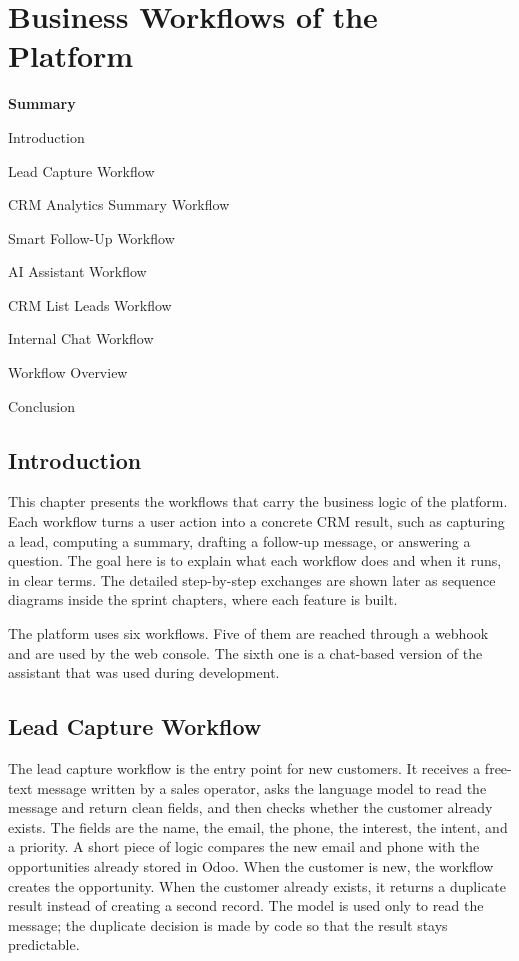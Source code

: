 \documentclass[12pt,a4paper,oneside]{report}
\newcommand{\chsummaryitem}[3]{\noindent\makebox[1.15cm][l]{#1}#2\,\dotfill\,\pageref{#3}\par}
\begin{document}
\chapter{Business Workflows of the Platform}

\vspace{0.35cm}
{\Large\bfseries Summary}\par
{}\vspace{0.30cm}
{\small
\chsummaryitem{3.1}{Introduction}{sumlbl:c3s1}
\chsummaryitem{3.2}{Lead Capture Workflow}{sumlbl:c3s2}
\chsummaryitem{3.3}{CRM Analytics Summary Workflow}{sumlbl:c3s3}
\chsummaryitem{3.4}{Smart Follow-Up Workflow}{sumlbl:c3s4}
\chsummaryitem{3.5}{AI Assistant Workflow}{sumlbl:c3s5}
\chsummaryitem{3.6}{CRM List Leads Workflow}{sumlbl:c3s6}
\chsummaryitem{3.7}{Internal Chat Workflow}{sumlbl:c3s7}
\chsummaryitem{3.8}{Workflow Overview}{sumlbl:c3s8}
\chsummaryitem{3.9}{Conclusion}{sumlbl:c3s9}
}
\clearpage

\section{Introduction}\label{sumlbl:c3s1}
This chapter presents the workflows that carry the business logic of the platform. Each workflow turns a user action into a concrete CRM result, such as capturing a lead, computing a summary, drafting a follow-up message, or answering a question. The goal here is to explain what each workflow does and when it runs, in clear terms. The detailed step-by-step exchanges are shown later as sequence diagrams inside the sprint chapters, where each feature is built.

The platform uses six workflows. Five of them are reached through a webhook and are used by the web console. The sixth one is a chat-based version of the assistant that was used during development.

\section{Lead Capture Workflow}\label{sumlbl:c3s2}
The lead capture workflow is the entry point for new customers. It receives a free-text message written by a sales operator, asks the language model to read the message and return clean fields, and then checks whether the customer already exists. The fields are the name, the email, the phone, the interest, the intent, and a priority. A short piece of logic compares the new email and phone with the opportunities already stored in Odoo. When the customer is new, the workflow creates the opportunity. When the customer already exists, it returns a duplicate result instead of creating a second record. The model is used only to read the message; the duplicate decision is made by code so that the result stays predictable.
\end{document}

